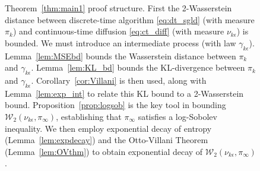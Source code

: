 \documentclass[journal,onecolumn]{IEEEtran}
\newcommand{\step}{\epsilon}
\newcommand{\wass}{\mathcal{W}_2}
\newcommand{\gibbs}{\ids_{\infty}}
\newcommand{\dtlaw}{\ids_{k}} %
\newcommand{\ctlaw}{\nu_{k\step}}
\newcommand{\ids}{\pi}
\newcommand{\idw}{\gamma}
\newcommand{\ksp}{k,\idw}
\newcommand{\ytlaw}{\gamma_{k\step}}
\begin{document}
{\begin{figure}
{}
\caption{\small Theorem~\ref{thm:main1} proof structure. First the 2-Wasserstein distance between discrete-time algorithm \eqref{eq:dt_sgld} (with measure $\dtlaw$) and continuous-time diffusion \eqref{eq:ct_diff} (with measure $\ctlaw$) is bounded. We must introduce an intermediate process (with law $\ytlaw$). Lemma~\ref{lem:MSEbd} bounds the Wasserstein distance between $\dtlaw$ and $\ytlaw$. Lemma~\ref{lem:KL_bd} bounds the KL-divergence between $\dtlaw$ and $\ytlaw$. Corollary~\ref{cor:Villani} is then used, along with Lemma~\ref{lem:exp_int} to relate this KL bound to a 2-Wasserstein bound. Proposition~\ref{prop:logsob} is the key tool in bounding $\wass(\ctlaw,\gibbs)$, establishing that $\gibbs$ satisfies a log-Sobolev inequality. We then employ exponential decay of entropy (Lemma~\ref{lem:expdecay}) and the Otto-Villani Theorem (Lemma~\ref{lem:OVthm}) to obtain exponential decay of $\wass(\ctlaw,\gibbs)$.}
\label{fig:blockdiag}
\end{figure}


}
\end{document}
